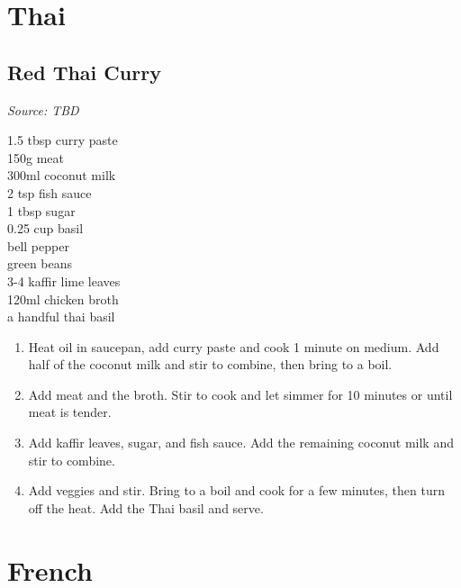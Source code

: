 \documentclass{report}
\begin{document}
\chapter{Thai}
\section{Red Thai Curry}
\textit{Source: TBD}\\
\begin{minipage}[t]{0.21\textwidth} \vspace{0pt} 
1.5 tbsp curry paste\\
150g meat\\
300ml coconut milk\\
2 tsp fish sauce\\
1 tbsp sugar\\
0.25 cup basil\\
bell pepper\\
green beans\\
3-4 kaffir lime leaves\\
120ml chicken broth\\
a handful thai basil
\end{minipage}
\hfill
\begin{minipage}[t]{0.78\textwidth} \vspace{0pt}
	\begin{enumerate}
		\item Heat oil in saucepan, add curry paste and cook 1 minute on medium. Add half of the coconut milk and stir to combine, then bring to a boil.
		\item Add meat and the broth. Stir to cook and let simmer for 10 minutes or until meat is tender.
		\item Add kaffir leaves, sugar, and fish sauce. Add the remaining coconut milk and stir to combine.
		\item Add veggies and stir. Bring to a boil and cook for a few minutes, then turn off the heat. Add the Thai basil and serve.
	\end{enumerate}	
\end{minipage}

\chapter{French}
\end{document}
